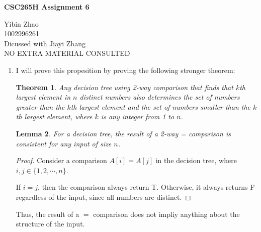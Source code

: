 \documentclass[10pt]{article}
\newtheorem{theorem}{Theorem}
\newtheorem{lemma}[theorem]{Lemma}
\begin{document}
\begin{center}
{\bf \Large \bf CSC265H Assignment 6}
\end{center}

\noindent
Yibin Zhao\\
1002996261\\
Dicussed with Jiayi Zhang\\
NO EXTRA MATERIAL CONSULTED\\

\begin{comment}
The median of a set of numbers is the element with rank $\lfloor (n+1)/2 \rfloor$.
\end{comment}

\begin{enumerate}
	
	\begin{comment}
	Prove that any decesion tree using 2-way comparisons that finds the median of $n$ distinct numbers 
	also determines the set of numbers greater than the median and the set of numbers smaller than the median.
	\end{comment}

	\item

	I will prove this propesition by proving the following stronger theorem:
	
	\begin{theorem}
	Any decision tree using 2-way comparison that finds that $k$th largest element in $n$ distinct numbers
	also determines the set of numbers greater than the $k$th largest element and
	the set of numbers smaller than the $k$th largest element, where $k$ is any integer from 1 to $n$.
	\end{theorem}

	\begin{lemma}
	For a decision tree, the result of a 2-way = comparison is consistent for any input of size $n$.
	\end{lemma}

	\begin{proof}
	Consider a comparison $A[i] = A[j]$ in the decision tree, where $i, j \in \{1, 2, \cdots, n\}$.

	If $i = j$, then the comparison always return T. 
	Otherwise, it always returns F regardless of the input, since all numbers are distinct.
	\end{proof}

	Thus, the result of a $=$ comparison does not impliy anything about the structure of the input.


\end{enumerate}
\end{document}
